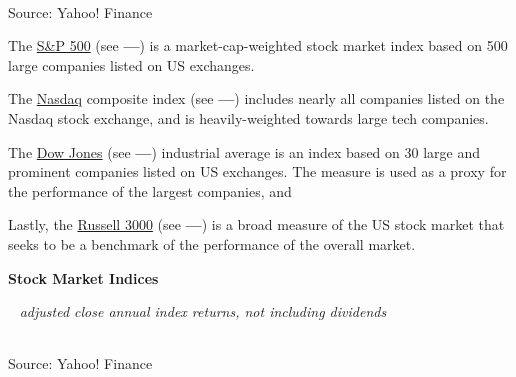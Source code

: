 \documentclass{report}
\newcommand{\tbllink}[1]{\href{https://raw.githubusercontent.com/bdecon/US-chartbook/master/chartbook/data/#1}{\faTable}}
\begin{document}
{{\begin{minipage}{0.76\textwidth}
\\
\footnotesize{Source: Yahoo! Finance} \hfill \tbllink{equity_indices.csv} 
\end{minipage}
\newpage
\begin{minipage}{0.76\textwidth}
\small The \href{https://us.spindices.com/indices/equity/sp-500}{S\&P 500} (see {\color{green!80!blue!90!black}\textbf{---}}) is a market-cap-weighted stock market index based on 500 large companies listed on US exchanges. 

The \href{https://www.nasdaq.com/market-activity/index/comp}{Nasdaq} composite index (see {\color{blue}\textbf{---}}) includes nearly all companies listed on the Nasdaq stock exchange, and is heavily-weighted towards large tech companies. 

The \href{https://finance.yahoo.com/quote/\%5EDJI/}{Dow Jones} (see {\color{red}\textbf{---}})  industrial average is an index based on 30 large and prominent companies listed on US exchanges. The measure is used as a proxy for the performance of the largest companies, and 

Lastly, the \href{https://www.ftserussell.com/products/indices/russell-us}{Russell 3000} (see {\color{violet}\textbf{---}}) is a broad measure of the US stock market that seeks to be a benchmark of the performance of the overall market. 
\vspace{1mm}

\normalsize \textbf{Stock Market Indices}\\
\footnotesize{\ \textit{\hspace{18mm} adjusted close \hspace{16mm} annual index returns, not including dividends}
\vspace{-2mm}

 \setlength{\tabcolsep}{2.0pt} \color{black!90}
{\renewcommand{\arraystretch}{1.54}
	\begin{tabular}{p{20mm} R{12.0mm} R{12.0mm} R{10.0mm} R{10.0mm} R{10.0mm} R{10.0mm} R{10.0mm} R{10.0mm}}
		 \hline
	\end{tabular}
}}
		
\vspace{-2mm}
\footnotesize{Source: Yahoo! Finance}
\vspace{3mm}


\end{minipage}}}
\end{document}
